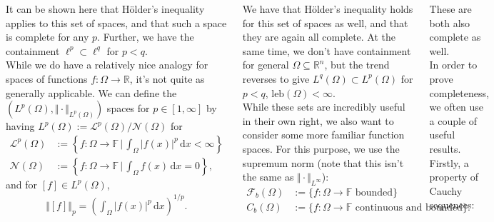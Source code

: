 \documentclass{tikzposter} %
\begin{document}
\begin{columns}
{    It can be shown here that H\"{o}lder's inequality applies to this set of spaces, and that such a space is complete for any $p$. Further, we have the containment $\ell^{p} \subset \ell^{q}$ for $p < q$. \\

    While we do have a relatively nice analogy for spaces of functions $f : \Omega \to \mathbb{R}$, it's not quite as generally applicable. We can define the $(L^{p}(\Omega), \Vert \cdot\Vert _{L^{p}(\Omega)})$ spaces for $p \in [1,\infty]$ by having $L^{p}(\Omega) := \mathcal{L}^{p}(\Omega)/\mathcal{N}(\Omega)$ for
    \begin{align*}
      \mathcal{L}^{p}(\Omega) &:= \left\{f : \Omega \to \mathbb{F} \,\Big|\, \int_{\Omega} |f(x)|^{p} \,\mathrm{d}x < \infty\right\} \\
      \mathcal{N}(\Omega) &:= \left\{f : \Omega \to \mathbb{F} \,\Big|\, \int_{\Omega} f(x) \,\mathrm{d}x = 0\right\},
    \end{align*}
    and for $[f] \in L^{p}(\Omega)$,
    \begin{align*}
      \Vert [f]\Vert _{p} = \left(\int_{\Omega} |f(x)|^{p}\, \mathrm{d}x\right)^{1/p}.
    \end{align*}

    We have that H\"{o}lder's inequality holds for this set of spaces as well, and that they are again all complete. At the same time, we don't have containment for general $\Omega \subseteq \mathbb{R}^{n}$, but the trend reverses to give $L^{q}(\Omega) \subset L^{p}(\Omega)$ for $p < q$, $\mathrm{leb}(\Omega) < \infty$. \\

    While these sets are incredibly useful in their own right, we also want to consider some more familiar function spaces. For this purpose, we use the supremum norm (note that this isn't the same as $\Vert \cdot\Vert _{L^{\infty}}$):
    \begin{align*}
      \mathcal{F}_{b}(\Omega) &:= \{f : \Omega \to \mathbb{F} \,\,\text{bounded}\} \\
      C_{b}(\Omega) &:= \{f : \Omega \to \mathbb{F} \,\,\text{continuous and bounded}\}.
    \end{align*}

    These are both also complete as well. \\

    In order to prove completeness, we often use a couple of useful results. Firstly, a property of Cauchy sequences:

}
\end{columns}
\end{document}
